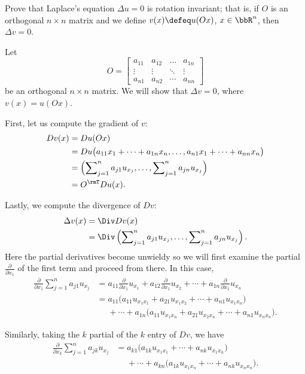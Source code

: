 \begin{problem}
  Prove that Laplace's equation \(\Delta u=0\) is rotation invariant; that
  is, if \(O\) is an orthogonal \(n\times n\) matrix and we define
  \(v(x)\defeq u(Ox)\), \(x\in\bbR^n\), then \(\Delta v=0\).
\end{problem}
\begin{solution}
  Let
  \[
    O=
    \begin{bmatrix}
      a_{11}&a_{12}&\dotsc&a_{1n}\\
      \vdots&\vdots&\ddots&\vdots\\
      a_{n1}&a_{n2}&\cdots&a_{nn}
    \end{bmatrix}
  \]
  be an orthogonal \(n\times n\) matrix. We will show that \(\Delta v=0\),
  where \(v(x)=u(Ox)\).

  First, let us compute the gradient of \(v\):
  \begin{align*}
    Dv(x)
    &=Du(Ox)\\
    &=Du\bigl(a_{11}x_1+\dotsb+a_{1n}x_n,\dotsc,a_{n1}x_1+\dotsb+a_{nn}x_n\bigr)\\
    &=\left(\sum\nolimits_{j=1}^na_{j1}u_{x_j},%
      \dotsc,%
      \sum\nolimits_{j=1}^n a_{jn}u_{x_j}\right)\\
    &=O^\rmT Du(x).
  \end{align*}

  Lastly, we compute the divergence of \(Dv\):
  \begin{align*}
    \Delta v(x)
    &=\Div Dv(x)\\
    &=\Div%
      \left(\sum\nolimits_{j=1}^na_{j1}u_{x_j},%
      \dotsc,%
      \sum\nolimits_{j=1}^n a_{jn}u_{x_j}\right).
  \end{align*}
  Here the partial derivatives become unwieldy so we will first examine the
  partial \(\frac{\partial}{\partial x_1}\) of the first term and proceed
  from there. In this case,
  \begin{align*}
    \frac{\partial}{\partial x_1}\sum_{j=1}^n a_{j1}u_{x_j}
    &=a_{11}\tfrac{\partial}{\partial
      x_1}u_{x_1}+a_{12}\tfrac{\partial}{\partial
      x_1}u_{x_2}+\dotsb+a_{1n}\tfrac{\partial}{\partial x_1}u_{x_n}\\
    &=a_{11}\bigl(a_{11}u_{x_1x_1}+a_{21}u_{x_1x_2}+\dotsb+a_{n1}u_{x_1x_n}\bigr)\\
    &\phantom{{}={}}+\dotsb+a_{1n}\bigl(a_{11}u_{x_1x_n}+a_{21}u_{x_2x_n}
      +\dotsb+a_{n1}u_{x_nx_n}\bigr).
  \end{align*}

  Similarly, taking the \(k\) partial of the \(k\)
  entry of \(Dv\), we have
  \begin{equation}
    \label{eq:5:laplacian-k-part}
    \begin{aligned}
      \frac{\partial}{\partial x_k}\sum_{j=1}^n a_{jk}u_{x_j}
      &=a_{k1}\bigl(a_{1k}u_{x_1x_1}+\dotsb+a_{nk}u_{x_1x_n}\bigr)\\
      &\phantom{{}={}}+\dotsb+a_{kn}
      \bigl(a_{1k}u_{x_1x_n}+\dotsb+a_{nk}u_{x_nx_n}\bigr).
    \end{aligned}
  \end{equation}
\end{solution}
\newpage

